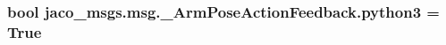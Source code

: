\subsubsection[{\texorpdfstring{python3}{python3}}]{\setlength{\rightskip}{0pt plus 5cm}bool jaco\+\_\+msgs.\+msg.\+\_\+\+Arm\+Pose\+Action\+Feedback.\+python3 = True}\hypertarget{namespacejaco__msgs_1_1msg_1_1__ArmPoseActionFeedback_a78b080e28ea04ed9c4896819b6476aa3}{}\label{namespacejaco__msgs_1_1msg_1_1__ArmPoseActionFeedback_a78b080e28ea04ed9c4896819b6476aa3}

